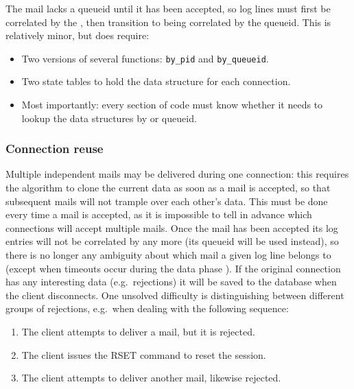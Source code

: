 The mail lacks a queueid until it has been accepted, so log lines must
first be correlated by the  \pid{}, then transition to being
correlated by the queueid.  This is relatively minor, but does require:

\begin{itemize}

    \item Two versions of several functions: \texttt{by\_pid} and
        \texttt{by\_queueid}.

    \item Two state tables to hold the data structure for each connection.

    \item Most importantly: every section of code must know whether it
        needs to lookup the data structures by \pid{} or queueid.

\end{itemize}

\subsubsection{Connection reuse}

\label{connection reuse}

Multiple independent mails may be delivered during one connection: this
requires the algorithm to clone the current data as soon as a mail is
accepted, so that subsequent mails will not trample over each other's data.
This must be done every time a mail is accepted, as it is impossible to
tell in advance which connections will accept multiple mails.  Once the
mail has been accepted its log entries will not be correlated by \pid{} any
more (its queueid will be used instead), so there is no longer any
ambiguity about which mail a given log line belongs to (except when
timeouts occur during the data phase
).  If the original connection has
any interesting data (e.g.\ rejections) it will be saved to the database
when the client disconnects.  One unsolved difficulty is distinguishing
between different groups of rejections, e.g.\ when dealing with the
following sequence:

\begin{enumerate}

    \item The client attempts to deliver a mail, but it is rejected.

    \item The client issues the RSET command to reset the session.

    \item The client attempts to deliver another mail, likewise rejected.

\end{enumerate}

